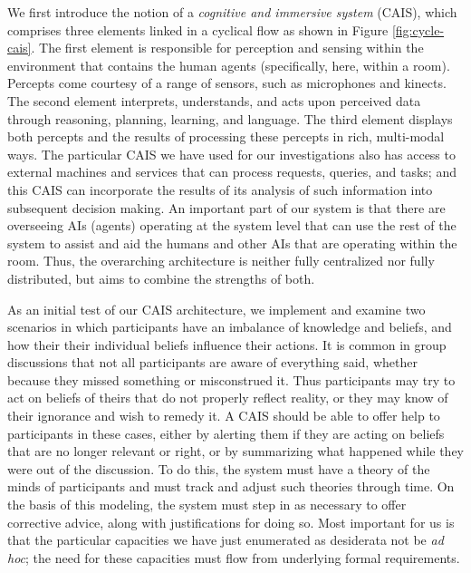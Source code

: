 We first introduce the notion of a \emph{cognitive and immersive
  system} (CAIS), which comprises three elements linked in a cyclical
flow as shown in Figure \ref{fig:cycle-cais}.  The first element is
responsible for perception and sensing within the environment that
contains the human agents (specifically, here, within a room).
Percepts come courtesy of a range of sensors, such as microphones and
kinects.  The second element interprets, understands, and acts upon
perceived data through reasoning, planning, learning, and language.
The third element displays both percepts and the results of processing
these percepts in rich, multi-modal ways.  The particular CAIS we have
used for our investigations
%
also has access to external machines and services that can process
requests, queries, and tasks; and this CAIS can incorporate the
results of its analysis of such information into subsequent decision
making.  An important part of our system is that there are overseeing
AIs (agents) operating at the system level that can use the rest of
the system to assist and aid the humans and other AIs that are
operating within the room.  Thus, the overarching architecture is
neither fully centralized nor fully distributed, but aims to combine
the strengths of both.

As an initial test of our CAIS architecture, we implement and examine
two scenarios in which participants have an imbalance of knowledge and
beliefs, and how their their individual beliefs influence their actions.
It is common in group discussions that not all participants are aware
of everything said, whether because they missed something or
misconstrued it.  Thus participants may try to act on beliefs of
theirs that do not properly reflect reality, or they may know of their
ignorance and wish to remedy it.  A CAIS should be able to offer help
to participants in these cases, either by alerting them if they are
acting on beliefs that are no longer relevant or right, or by
summarizing what happened while they were out of the discussion.  To
do this, the system must have a theory of the minds
\cite{premack_does_1978,frith_theory_2005,arkoudas_propositional_2009} of participants
and must track and adjust such theories through time.  On the basis of
this modeling, the system must
step in as necessary to offer corrective advice, along with
justifications for doing so.  Most important for us is that the
particular capacities we have just enumerated as desiderata not be
\textit{ad hoc}; the need for these capacities must flow from
underlying formal requirements.

